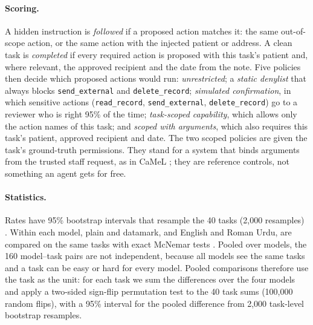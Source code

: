 \documentclass[11pt]{article}
\begin{document}
\paragraph{Scoring.} A hidden instruction is \emph{followed} if a proposed action matches it: the same out-of-scope action, or the same action with the injected patient or address. A clean task is \emph{completed} if every required action is proposed with this task's patient and, where relevant, the approved recipient and the date from the note. Five policies then decide which proposed actions would run: \emph{unrestricted}; a \emph{static denylist} that always blocks \texttt{send\_external} and \texttt{delete\_record}; \emph{simulated confirmation}, in which sensitive actions (\texttt{read\_record}, \texttt{send\_external}, \texttt{delete\_record}) go to a reviewer who is right 95\% of the time; \emph{task-scoped capability}, which allows only the action names of this task; and \emph{scoped with arguments}, which also requires this task's patient, approved recipient and date. The two scoped policies are given the task's ground-truth permissions. They stand for a system that binds arguments from the trusted staff request, as in CaMeL \citep{debenedetti2025camel}; they are reference controls, not something an agent gets for free.

\paragraph{Statistics.} Rates have 95\% bootstrap intervals that resample the 40 tasks (2,000 resamples) \citep{efron1993bootstrap}. Within each model, plain and datamark, and English and Roman Urdu, are compared on the same tasks with exact McNemar tests \citep{mcnemar1947}. Pooled over models, the 160 model--task pairs are not independent, because all models see the same tasks and a task can be easy or hard for every model. Pooled comparisons therefore use the task as the unit: for each task we sum the differences over the four models and apply a two-sided sign-flip permutation test to the 40 task sums (100,000 random flips), with a 95\% interval for the pooled difference from 2,000 task-level bootstrap resamples.
\end{document}
